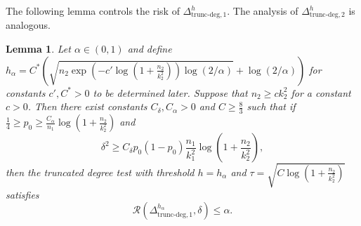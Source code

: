 \documentclass{article}
\newcommand{\cR}{\mathcal{R}}
\newcommand{\chisqlin}{\text{trunc-deg}}
\newtheorem{lemma}{Lemma}
\begin{document}
The following lemma controls the risk of $\Delta^{h}_{\chisqlin, 1}$. The analysis of $\Delta^{h}_{\chisqlin, 2}$ is analogous.
\begin{lemma}\label{lem_truncated_degree_test}
    Let $\alpha \in (0,1)$ and define $h_\alpha = C^*\left(\sqrt{n_2\exp\left(-c' \log(1 + \frac{n_2}{k_2^2})\right)\log(2/\alpha)} + \log(2/\alpha)\right)$ for constants $c', C^* > 0$ to be determined later. Suppose that $n_2 \geq c k_2^2$ for a constant $c > 0$. Then there exist constants $C_\delta, C_\alpha > 0$ and $C \geq \frac83$ such that if $\frac14 \geq p_0 \geq \frac{C_\alpha}{n_1} \log\left(1+ \frac{n_2}{k_2^2}\right)$ and
    \[\delta^2 \geq C_\delta p_0(1-p_0)\frac{n_1}{k_1^2}\log\left(1+\frac{n_2}{k_2^2}\right),\]
    then the truncated degree test with threshold $h = h_\alpha$ and $\tau = \sqrt{C\log\left(1 + \frac{n_2}{k_2^2}\right)}$ satisfies
    \[\cR(\Delta^{h_\alpha}_{\chisqlin, 1}, \delta) \leq \alpha.\]
\end{lemma}
\end{document}
